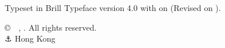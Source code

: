 \thispagestyle{empty}
\vspace*{\fill}
\begin{center}
{\small Typeset in Brill Typeface version 4.0 with  on  (Revised on ).\par}
\vspace{0.5ex}
\makeatletter
{\small \copyright\ \theauthor~,  \@dtm@ini@year. All rights reserved. \\ ⚓ Hong Kong} 
\makeatother
\vspace{-2.75ex}
\end{center}

